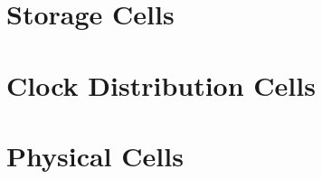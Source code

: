 


\chapter{Storage Cells}
\clearpage





\chapter{Clock Distribution Cells}
\clearpage





\chapter{Physical Cells}
\clearpage









